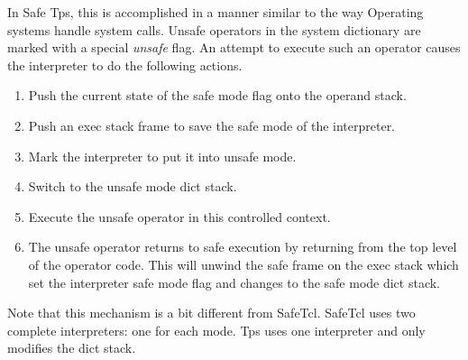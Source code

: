 In Safe Tps, this is accomplished in a manner similar
to the way Operating systems handle system calls.
Unsafe operators in the system dictionary are marked
with a special {\em unsafe} flag.
An attempt to execute such an operator causes the interpreter
to do the following actions.
\begin{enumerate}
\item Push the current state of the safe mode flag onto the operand stack.
\item Push an exec stack frame to save the safe mode of the interpreter.
\item Mark the interpreter to put it into unsafe mode.
\item Switch to the unsafe mode dict stack.
\item Execute the unsafe operator in this controlled
context.
\item The unsafe operator returns to safe execution
by returning from the top level of the operator code.
This will unwind the safe frame on the exec stack
which set the interpreter safe mode flag and changes
to the safe mode dict stack.
\end{enumerate}
Note that this mechanism is a bit different from
SafeTcl.  SafeTcl uses two complete interpreters: one for each mode.
Tps uses one interpreter and only modifies the dict stack.

